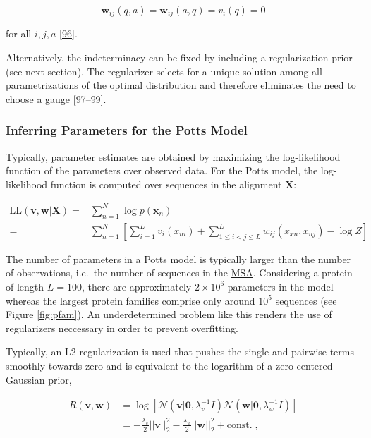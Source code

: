 \documentclass[11pt,a4paper,twoside]{book}
\newcommand{\seq}{\mathbf{x}}
\renewcommand{\v}{\mathbf{v}}
\newcommand{\vi}{v_{i}}
\newcommand{\w}{\mathbf{w}}
\newcommand{\wij}{\mathbf{w}_{ij}}
\theoremstyle{definition}
\theoremstyle{definition}
\theoremstyle{remark}
\begin{document}
\begin{equation}
    \wij(q,a) = \wij(a,q) = \vi(q) = 0
\label{eq:ising-gauge}
\end{equation}

for all \(i,j,a\) {[}\protect\hyperlink{ref-Cocco2017}{96}{]}.

Alternatively, the indeterminacy can be fixed by including a
regularization prior (see next section). The regularizer selects for a
unique solution among all parametrizations of the optimal distribution
and therefore eliminates the need to choose a gauge
{[}\protect\hyperlink{ref-Koller2009}{97}--\protect\hyperlink{ref-Stein2015a}{99}{]}.

\subsubsection{Inferring Parameters for the Potts
Model}\label{potts-mle}

Typically, parameter estimates are obtained by maximizing the
log-likelihood function of the parameters over observed data. For the
Potts model, the log-likelihood function is computed over sequences in
the alignment \(\mathbf{X}\):

\begin{align}
    \text{LL}(\v, \w | \mathbf{X}) =& \sum_{n=1}^N \log p(\seq_n)  \nonumber\\
    =& \sum_{n=1}^N \left[ \sum_{i=1}^L v_i(x_{ni}) + \sum_{1 \leq i < j \leq L}^L w_{ij}(x_{xn}, x_{nj}) - \log Z \right]
\label{eq:full-log-likelihood}
\end{align}

The number of parameters in a Potts model is typically larger than the
number of observations, i.e.~the number of sequences in the
\protect\hyperlink{abbrev}{MSA}. Considering a protein of length
\(L=100\), there are approximately \(2 \times 10^6\) parameters in the
model whereas the largest protein families comprise only around \(10^5\)
sequences (see Figure \ref{fig:pfam}). An underdetermined problem like
this renders the use of regularizers neccessary in order to prevent
overfitting.

Typically, an L2-regularization is used that pushes the single and
pairwise terms smoothly towards zero and is equivalent to the logarithm
of a zero-centered Gaussian prior,

\begin{align}
  R(\v, \w)  &= \log \left[ \mathcal{N}(\v | \mathbf{0}, \lambda_v^{-1} I) \mathcal{N}(\w | \mathbf{0}, \lambda_w^{-1} I) \right] \nonumber \\
             &= -\frac{\lambda_v}{2} ||\v||_2^2 - \frac{\lambda_w}{2} ||\w||_2^2 + \text{const.} \; ,
\label{eq:l2-reg}
\end{align}
\end{document}
